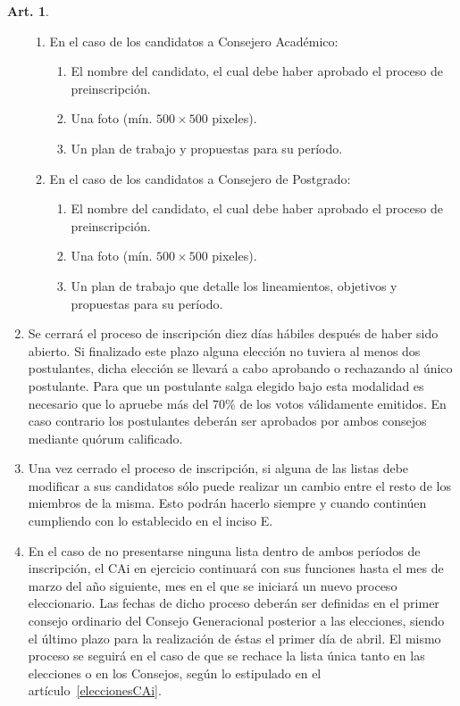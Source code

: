 \documentclass[letterpaper,11pt]{article}
\theoremstyle{definition}%
\newtheorem{art}{Art.} %
\begin{document}
\begin{art}
\begin{enumerate}
\begin{enumerate}
			      \item En el caso de los candidatos a Consejero Académico:
			            \begin{enumerate}
				            \item El nombre del candidato, el cual debe haber aprobado el proceso de preinscripción.
				            \item Una foto (mín. $500 \times 500$ pixeles).
				            \item Un plan de trabajo y propuestas para su período.
			            \end{enumerate}

			      \item En el caso de los candidatos a Consejero de Postgrado:
			            \begin{enumerate}
				            \item El nombre del candidato, el cual debe haber aprobado el proceso de preinscripción.
				            \item Una foto (mín. $500 \times 500$ pixeles).
				            \item Un plan de trabajo que detalle los lineamientos, objetivos y propuestas para su período.
			            \end{enumerate}
		      \end{enumerate}

		\item\label{cierre}Se cerrará el proceso de inscripción diez días hábiles después de haber sido abierto. Si finalizado este plazo alguna elección no tuviera al menos dos postulantes, dicha elección se llevará a cabo aprobando o rechazando al único postulante. Para que un postulante salga elegido bajo esta modalidad es necesario que lo apruebe más del 70\% de los votos válidamente emitidos. En caso contrario los postulantes deberán ser aprobados por ambos consejos mediante quórum calificado.

		\item Una vez cerrado el proceso de inscripción, si alguna de las listas debe modificar a sus candidatos sólo puede realizar un cambio entre el resto de los miembros de la misma. Esto podrán hacerlo siempre y cuando continúen cumpliendo con lo establecido en el inciso E.

		\item En el caso de no presentarse ninguna lista dentro de ambos períodos de inscripción, el CAi en ejercicio continuará con sus funciones hasta el mes de marzo del año siguiente, mes en el que se iniciará un nuevo proceso eleccionario. Las fechas de dicho proceso deberán ser definidas en  el primer consejo ordinario del Consejo Generacional posterior a las elecciones, siendo el último plazo para la realización de éstas el primer día de abril. El mismo proceso se seguirá en el caso de que se rechace la lista única tanto en las elecciones o en los Consejos, según lo estipulado en el artículo~\ref{eleccionesCAi}.


\end{enumerate}
\end{art}
\end{document}
